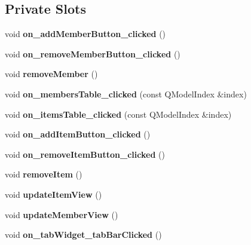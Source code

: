 \subsection*{Private Slots}
\begin{DoxyCompactItemize}
\item 
\mbox{\label{class_admin_window_a997a485ed7faa9841581187ad14288ea}} 
void {\bfseries on\+\_\+add\+Member\+Button\+\_\+clicked} ()
\item 
\mbox{\label{class_admin_window_a8c3cf24ae2f2e441639b8f2a3b318a19}} 
void {\bfseries on\+\_\+remove\+Member\+Button\+\_\+clicked} ()
\item 
\mbox{\label{class_admin_window_ac723fe967e1c49191addbea8ce544f9a}} 
void {\bfseries remove\+Member} ()
\item 
\mbox{\label{class_admin_window_ae8dd3cfbbbb415ddc4500ed32a752a50}} 
void {\bfseries on\+\_\+members\+Table\+\_\+clicked} (const Q\+Model\+Index \&index)
\item 
\mbox{\label{class_admin_window_aaff02ef0ba11fff530f3b452a314344c}} 
void {\bfseries on\+\_\+items\+Table\+\_\+clicked} (const Q\+Model\+Index \&index)
\item 
\mbox{\label{class_admin_window_a2124b4c1c17e5304b5b836e86c2dcaa6}} 
void {\bfseries on\+\_\+add\+Item\+Button\+\_\+clicked} ()
\item 
\mbox{\label{class_admin_window_a68908f105ccb9b59a6633c475f49cf54}} 
void {\bfseries on\+\_\+remove\+Item\+Button\+\_\+clicked} ()
\item 
\mbox{\label{class_admin_window_acc030ee24589408438cd643c512a1945}} 
void {\bfseries remove\+Item} ()
\item 
\mbox{\label{class_admin_window_ab76dc76762081f6b697e72a19fc44a60}} 
void {\bfseries update\+Item\+View} ()
\item 
\mbox{\label{class_admin_window_a96d1b92ba3008ee2bb0d689812b178c5}} 
void {\bfseries update\+Member\+View} ()
\item 
\mbox{\label{class_admin_window_a6a969766e3ed768c11fcf3d698a75ee8}} 
void {\bfseries on\+\_\+tab\+Widget\+\_\+tab\+Bar\+Clicked} ()
\end{DoxyCompactItemize}
